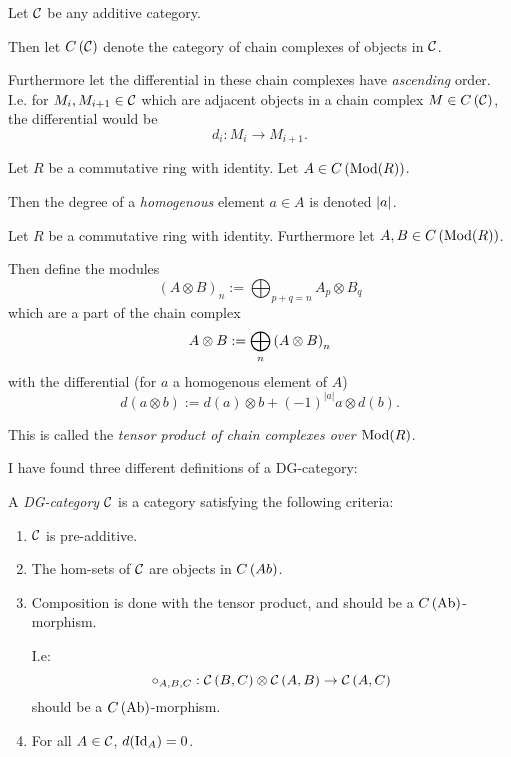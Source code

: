 \begin{notation}
    Let \( {\mathcal{C}} \) be any additive category.
    
    Then let \( C \left( {\mathcal{C}} \right) \) denote the category of chain complexes of objects in \( {\mathcal{C}} \).

    Furthermore let the differential in these chain complexes have \emph{ascending} order. I.e. for \( M_i, M_{i+1} \in {\mathcal{C}} \) which are adjacent objects in a chain complex \( M \in C \left( {\mathcal{C}} \right) \), the differential would be
    \[
        d_i : M_i \to M_{i + 1}.
    \]
\end{notation}

\begin{notation}
    Let \( R \) be a commutative ring with identity. Let \( A \in C \left( \operatorname{Mod}(R) \right) \).

    Then the degree of a \emph{homogenous} element \( a \in A \) is denoted \emph{\( \lvert a \rvert \)}.
\end{notation}

\begin{definition}
    \label{def:massey_product_in_dg_cat/what_is_a_dg_cat/tensor_product_of_chain_complexes}
    Let \( R \) be a commutative ring with identity. Furthermore let \( A, B \in C \left( \operatorname{Mod}(R) \right) \).

    Then define the modules
    \[
        (A \otimes B)_n := \bigoplus_{p + q = n} A_p \otimes B_q
    \]
    which are a part of the chain complex
    \[
        A \otimes B := \bigoplus_n \left( A \otimes B \right)_n
    \]
    with the differential (for \( a \) a homogenous element of \( A \))
    \[
        d(a \otimes b) := d(a) \otimes b + (-1)^{|a|} a \otimes d(b).
    \]

    This is called the \emph{tensor product of chain complexes over \( \operatorname{Mod}(R) \)}.
\end{definition}

I have found three different definitions of a DG-category:

\begin{definition}
    \label{def:massey_product_in_dg_cat/what_is_a_dg_cat/dg_cat_bondal--kapranov_1991}
    A \emph{DG-category} \( {\mathcal{C}} \) is a category satisfying the following criteria:
    \begin{enumerate}
        \item \( {\mathcal{C}} \) is pre-additive.
        \item The hom-sets of \( {\mathcal{C}} \) are objects in \( C \left( Ab \right) \).
        \item{
            Composition is done with the tensor product, and should be a \( C \left( \operatorname{Ab} \right) \)-morphism.

            I.e:
            \[
                \circ_{A,B,C}: {\mathcal{C}} \left( B, C \right) \otimes {\mathcal{C}} \left( A, B \right) \to {\mathcal{C}} \left( A, C \right)
            \]
            should be a \( C \left( \operatorname{Ab} \right) \)-morphism.
        }
        \item For all \( A \in {\mathcal{C}} \), \( d(\operatorname{Id}_A) = 0 \).
    \end{enumerate}
\end{definition}

